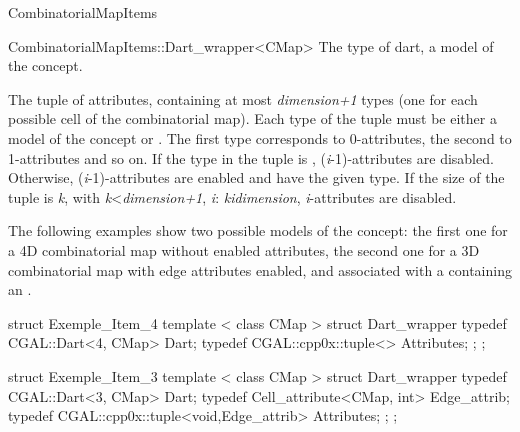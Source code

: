 \begin{ccRefConcept}{CombinatorialMapItems}
\begin{ccClass}{CombinatorialMapItems::Dart_wrapper<CMap>}
    {The type of dart, a model of the  concept.}

{The tuple of attributes, containing at most
  \emph{dimension+1} types (one for each possible cell of the combinatorial
  map).  Each type of the tuple must be either a model of the
   concept or .
  The first type corresponds to 0-attributes, 
  the second to 1-attributes and so on. 
  If the  type in the tuple is , 
  (\emph{i}-1)-attributes are disabled. Otherwise, (\emph{i}-1)-attributes are enabled and
  have the given type.  If the size of the tuple is \emph{k},
  with \emph{k}<\emph{dimension+1}, 
  \myforall{}\emph{i}: \emph{k}\myleq{}\emph{i}\myleq{}\emph{dimension},
  \emph{i}-attributes are disabled.}
\end{ccClass}

\ccExample
The following examples show two possible models of the
 concept: the first one for a 4D
combinatorial map without enabled attributes, the second one for a 3D
combinatorial map with edge attributes enabled, and associated with a
 containing an .

\begin{ccExampleCode}
struct Exemple_Item_4
{
   template < class CMap >
   struct Dart_wrapper
   {
     typedef CGAL::Dart<4, CMap> Dart;
     typedef CGAL::cpp0x::tuple<> Attributes;
   };
};
\end{ccExampleCode}

\begin{ccExampleCode}
struct Exemple_Item_3
{
   template < class CMap >
   struct Dart_wrapper
   {
     typedef CGAL::Dart<3, CMap> Dart;
     typedef Cell_attribute<CMap, int> Edge_attrib;
     typedef CGAL::cpp0x::tuple<void,Edge_attrib> Attributes;
   };
};
\end{ccExampleCode}    

\ccHasModels
{}

\ccSeeAlso
\\

\end{ccRefConcept}
\ccRefPageEnd

